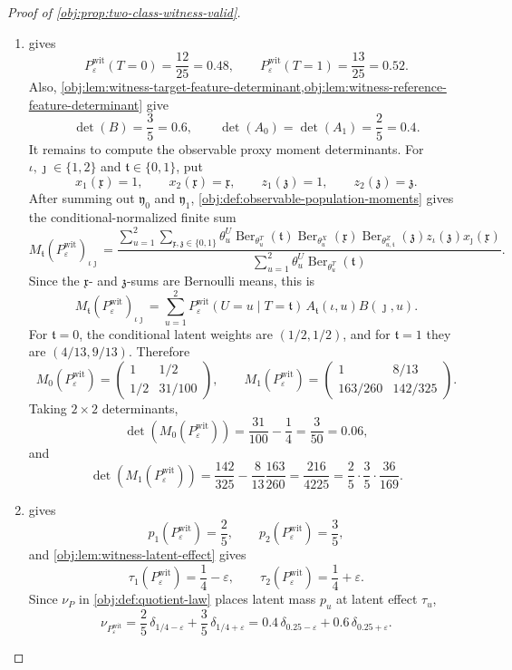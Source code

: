 \begin{proof}[Proof of \cref{obj:prop:two-class-witness-valid}]
\begin{enumerate}
\item {} gives
\[
P_{\varepsilon}^{\mathrm{wit}}(T=0)=\frac{12}{25}=0.48,\qquad
P_{\varepsilon}^{\mathrm{wit}}(T=1)=\frac{13}{25}=0.52 .
\]
Also, \cref{obj:lem:witness-target-feature-determinant,obj:lem:witness-reference-feature-determinant} give
\[
\det(B)=\frac35=0.6,\qquad
\det(A_0)=\det(A_1)=\frac25=0.4 .
\]
It remains to compute the observable proxy moment determinants.  For \(\iota,\jmath\in\{1,2\}\) and
\(\mathfrak t\in\{0,1\}\), put
\[
x_1(\mathfrak x)=1,\qquad x_2(\mathfrak x)=\mathfrak x,\qquad
z_1(\mathfrak z)=1,\qquad z_2(\mathfrak z)=\mathfrak z .
\]
After summing out \(\mathfrak y_0\) and \(\mathfrak y_1\), \cref{obj:def:observable-population-moments} gives the conditional-normalized finite sum
\[
M_{\mathfrak t}(P_{\varepsilon}^{\mathrm{wit}})_{\iota\jmath}
=
\frac{
\sum_{u=1}^{2}\sum_{\mathfrak x,\mathfrak z\in\{0,1\}}
\theta^U_u\operatorname{Ber}_{\theta^T_u}(\mathfrak t)
\operatorname{Ber}_{\theta^X_u}(\mathfrak x)
\operatorname{Ber}_{\theta^Z_{u,\mathfrak t}}(\mathfrak z)
z_\iota(\mathfrak z)x_\jmath(\mathfrak x)}
{\sum_{u=1}^{2}\theta^U_u\operatorname{Ber}_{\theta^T_u}(\mathfrak t)} .
\]
Since the \(\mathfrak x\)- and \(\mathfrak z\)-sums are Bernoulli means, this is
\[
M_{\mathfrak t}(P_{\varepsilon}^{\mathrm{wit}})_{\iota\jmath}
=
\sum_{u=1}^{2}
P_{\varepsilon}^{\mathrm{wit}}(U=u\mid T=\mathfrak t)\,
A_{\mathfrak t}(\iota,u)B(\jmath,u).
\]
For \(\mathfrak t=0\), the conditional latent weights are \((1/2,1/2)\), and for
\(\mathfrak t=1\) they are \((4/13,9/13)\).  Therefore
\[
M_0(P_{\varepsilon}^{\mathrm{wit}})
=
\begin{pmatrix}
1&1/2\\[2pt]
1/2&31/100
\end{pmatrix},
\qquad
M_1(P_{\varepsilon}^{\mathrm{wit}})
=
\begin{pmatrix}
1&8/13\\[2pt]
163/260&142/325
\end{pmatrix}.
\]
Taking \(2\times2\) determinants,
\[
\det(M_0(P_{\varepsilon}^{\mathrm{wit}}))
=
\frac{31}{100}-\frac14
=
\frac3{50}
=
0.06,
\]
and
\[
\det(M_1(P_{\varepsilon}^{\mathrm{wit}}))
=
\frac{142}{325}-\frac8{13}\frac{163}{260}
=
\frac{216}{4225}
=
\frac25\cdot\frac35\cdot\frac{36}{169}.
\] %

\item {} gives
\[
p_1(P_{\varepsilon}^{\mathrm{wit}})=\frac25,\qquad
p_2(P_{\varepsilon}^{\mathrm{wit}})=\frac35,
\]
and \cref{obj:lem:witness-latent-effect} gives
\[
\tau_1(P_{\varepsilon}^{\mathrm{wit}})=\frac14-\varepsilon,\qquad
\tau_2(P_{\varepsilon}^{\mathrm{wit}})=\frac14+\varepsilon .
\]
Since \(\nu_P\) in \cref{obj:def:quotient-law} places latent mass \(p_u\) at latent effect \(\tau_u\),
\[
\nu_{P_{\varepsilon}^{\mathrm{wit}}}
=
\frac25\,\delta_{1/4-\varepsilon}
+
\frac35\,\delta_{1/4+\varepsilon}
=
0.4\,\delta_{0.25-\varepsilon}
+
0.6\,\delta_{0.25+\varepsilon}.
\] %


\end{enumerate}
\end{proof}
